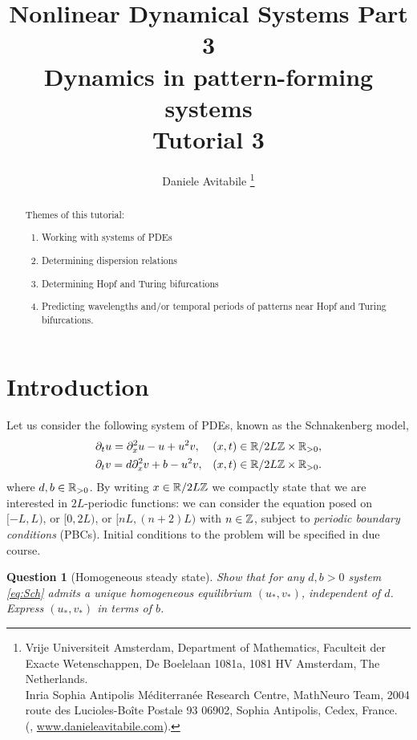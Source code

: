 \documentclass[a4paper]{siamart220329}
\title{Nonlinear Dynamical Systems Part 3 \\ 
  Dynamics in pattern-forming systems \\
  Tutorial 3
}
\author{%
  Daniele Avitabile%
  \thanks{%
    Vrije Universiteit Amsterdam,
    Department of Mathematics,
    Faculteit der Exacte Wetenschappen,
    De Boelelaan 1081a,
    1081 HV Amsterdam, The Netherlands.
  \protect\\
    Inria Sophia Antipolis M\'editerran\'ee Research Centre,
    MathNeuro Team,
    2004 route des Lucioles-Boîte Postale 93 06902,
    Sophia Antipolis, Cedex, France.
  \protect\\
    (\email{d.avitabile@vu.nl}, \url{www.danieleavitabile.com}).
  }
}
\theoremstyle{plain}
\newtheorem{question}{Question}
\begin{document}
\maketitle

\begin{abstract}
  Themes of this tutorial:
  \begin{enumerate}
    \item Working with systems of PDEs
    \item Determining dispersion relations
    \item Determining Hopf and Turing bifurcations
    \item Predicting wavelengths and/or temporal periods of patterns near Hopf and
      Turing bifurcations.
  \end{enumerate}
\end{abstract}

\section{Introduction}
  Let us consider the following system of PDEs, known as the Schnakenberg model,
  \begin{equation}\label{eq:Sch}
    \begin{aligned}
      & \partial_t u =   \partial_x^2 u - u + u^2 v, 
	&& (x,t) \in \RSet/ 2L \ZSet \times \RSet_{>0}, \\
      & \partial_t v = d \partial_x^2 v + b - u^2v,
	&& (x,t) \in \RSet/ 2L \ZSet \times \RSet_{>0}.\\
    \end{aligned}
  \end{equation} 
  where $d,b \in \mathbb{R}_{>0}$. By writing $x \in \mathbb{R} / 2L \mathbb{Z}$ we compactly state that we are interested in
  $2L$-periodic functions: we can consider the equation posed on $[-L,L)$, or
  $[0,2L)$, or $[nL,(n+2)L)$ with $n \in \mathbb{Z}$, subject to
  \textit{periodic boundary conditions} (PBCs). Initial conditions to the problem
  will be specified in due course.

\begin{question}[Homogeneous steady state]\label{ques:HSS}
  Show that  for any $d,b >0$ system \cref{eq:Sch} admits a unique homogeneous
  equilibrium $(u_*,v_*)$, independent of $d$. Express $(u_*,v_*)$ in terms of $b$.
\end{question}
\end{document}
